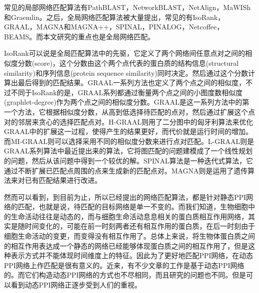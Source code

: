 常见的局部网络匹配算法有PathBLAST\cite{kelley2004pathblast}，NetworkBLAST\cite{sharan2005conserved}，NetAlign\cite{liang2006netalign}，MaWISh\cite{koyuturk2006pairwise}和Graemlin\cite{flannick2006graemlin}。之后，全局网络匹配算法被大量提出，常见的有IsoRank\cite{singh2008global,liao2009isorankn}，GRAAL\cite{kuchaiev2011integrative,malod2015graal,kuchaiev2010topological,milenkovic2010optimal,memivsevic2012c}，MAGNA和MAGNA++\cite{saraph2014magna,vijayan2015magna++}，SPINAL\cite{aladaug2013spinal}，PINALOG\cite{phan2012pinalog}，Netcoffee\cite{hu2013netcoffee}，BEAMS\cite{alkan2014beams}。而本文研究的重点也是全局网络匹配。

IsoRank\cite{singh2008global}可以说是全局匹配算法中的先驱，它定义了两个网络间任意点对之间的相似度分数(score)，这个分数由这个两个点代表的蛋白质的结构信息(structural similarity)和序列信息(protein sequence similarity)同时决定。然后通过这个分数计算出最后得到的匹配结果。GRAAL一系列方法也定义了两个点之间的相似度，不过不同于IsoRank的是，GRAAL系列都通过衡量两个点之间的小图度数相似度(graphlet-degree)作为两个点之间的相似度分数。GRAAL\cite{kuchaiev2010topological}是这一系列方法中的第一个方法，它根据相似度分数，从高到低选择待匹配的点对，然后通过扩展这个点对的邻居来贪心的选择匹配点对。H-GRAAL\cite{milenkovic2010optimal}则用了二分图中的匈牙利算法来优化GRAAL中的扩展这一过程，使得产生的结果更好，而代价就是运行时间的增加。而MI-GRAAL\cite{kuchaiev2011integrative}则可以选择采用不同的相似度分数来进行点对匹配。L-GRAAL\cite{malod2015graal}则是GRAAL系列算法中最近提出来的算法，它将图匹配的问题建模成了一个线性规划的问题，然后从该问题中得到一个较优的解。SPINAL算法\cite{aladaug2013spinal}是一种迭代式算法，它通过不断扩展已匹配点周围的点来生成新的匹配点对。MAGNA\cite{saraph2014magna}则是运用了遗传算法来对已有匹配结果进行改进。

然而可以看到，到目前为止，所以已经提出的网络匹配算法，都是针对静态PPI网络的匹配，也就是说，待匹配的目标网络是单一不变的。而我们知道，生物细胞中的生命活动往往是动态的，而与细胞生命活动息息相关的蛋白质相互作用网络，其实是随时间变化的，可能在前一时刻两者还有相互作用的蛋白质，在后一时刻由于细胞生命活动的变更，而变得没有相互作用了。总体上来说，将生物体蛋白质之间的相互作用表达成一个静态的网络已经能够体现蛋白质之间的相互作用了，但是这种表示方式并不能体现时间维度上的特征。因此为了更好地匹配PPI网络，在动态PPI网络上作匹配是很有意义的。近来，有不少文章的工作是基于动态PPI网络的\cite{lin2010dynamic,chen2014identifying,wang2013construction}。而它们构造动态PPI网络的方式也不尽相同，而且研究的问题也不同。但是可以看到动态PPI网络正逐步受到人们的重视。

